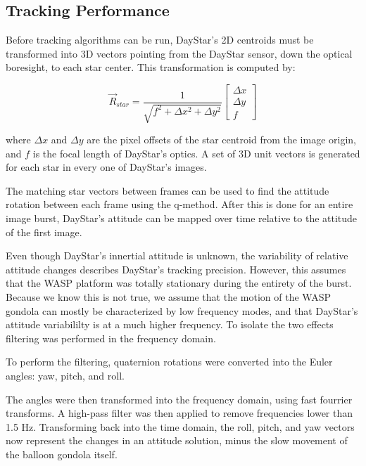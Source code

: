 \documentclass[twocolumn,letterpaper]{IEEEAerospace2012}
\begin{document}
\subsection{Tracking Performance}
Before tracking algorithms can be run, DayStar's 2D centroids must be transformed into 3D vectors pointing from the DayStar sensor, down the optical boresight, to each star center. This transformation is computed by:

\begin{equation}
\vec{R}_{star} = \frac{1}{\sqrt{f^2 + \Delta{x^2} + \Delta{y^2}}}
		  \begin{bmatrix}
                  \Delta{x} \\
                  \Delta{y} \\
                  f
                 \end{bmatrix}
\end{equation}

where $\Delta{x}$ and $\Delta{y}$ are the pixel offsets of the star centroid from the image origin, and $f$ is the focal length of DayStar's optics. A set of 3D unit vectors is generated for each star in every one of DayStar's images.

The matching star vectors between frames can be used to find the attitude rotation between each frame using the q-method. After this is done for an entire image burst, DayStar's attitude can be mapped over time relative to the attitude of the first image.

Even though DayStar's innertial attitude is unknown, the variability of relative attitude changes describes DayStar's tracking precision. However, this assumes that the WASP platform was totally stationary during the entirety of the burst. Because we know this is not true, we assume that the motion of the WASP gondola can mostly be characterized by low frequency modes, and that DayStar's attitude variabililty is at a much higher frequency. To isolate the two effects filtering was performed in the frequency domain.

To perform the filtering, quaternion rotations were converted into the Euler angles: yaw, pitch, and roll.

The angles were then transformed into the frequency domain, using fast fourrier transforms. A high-pass filter was then applied to remove frequencies lower than 1.5 Hz. Transforming back into the time domain, the roll, pitch, and yaw vectors now represent the changes in an attitude solution, minus the slow movement of the balloon gondola itself.
\end{document}
